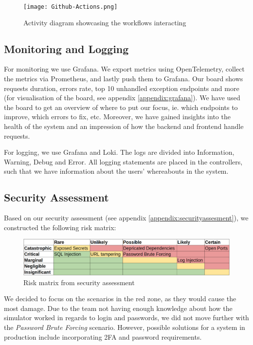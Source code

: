 \begin{figure}[H]
    \centering
    \texttt{[image: Github-Actions.png]}
    \caption{Activity diagram showcasing the workflows interacting }
    \label{fig:workflows}
\end{figure}

\subsection{Monitoring and Logging}
For monitoring we use Grafana. We export metrics using OpenTelemetry, collect the metrics via Prometheus, and lastly push them to Grafana. Our board shows requests duration, errors rate, top 10 unhandled exception endpoints and more (for visualisation of the board, see appendix \ref{appendix:grafana}). We have used the board to get an overview of where to put our focus, ie. which endpoints to improve, which errors to fix, etc. Moreover, we have gained insights into the health of the system and an impression of how the backend and frontend handle requests.

For logging, we use Grafana and Loki. The logs are divided into Information, Warning, Debug and Error. All logging statements are placed in the controllers, such that we have information about the users' whereabouts in the system.

\subsection{Security Assessment}
Based on our security assessment (see appendix \ref{appendix:securityassesment}), we constructed the following risk matrix:
\begin{figure}[H]
    \centering
    \includegraphics[width=1\linewidth]{images/risk-matrix.png}
    \caption{Risk matrix from security assessment}
    \label{fig:enter-label}
\end{figure}
We decided to focus on the scenarios in the red zone, as they would cause the most damage. Due to the team not having enough knowledge about how the simulator worked in regards to login and passwords, we did not move further with the \textit{Password Brute Forcing} scenario. However, possible solutions for a system in production include incorporating 2FA and password requirements.

